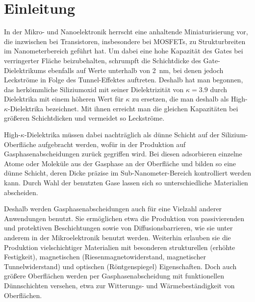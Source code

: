 \cleardoublepage
\chapter{Einleitung}
\label{intro}


In der Mikro- und Nanoelektronik herrscht eine anhaltende Miniaturisierung vor, die inzwischen bei Transistoren, insbesondere bei MOSFETs, zu Strukturbreiten im Nanometerbereich geführt hat.
Um dabei eine hohe Kapazität des Gates bei verringerter Fläche beizubehalten, schrumpft die Schichtdicke des Gate-Dielektrikums ebenfalls auf Werte unterhalb von \SI{2}{\nano\meter}, bei denen jedoch Leckströme in Folge des Tunnel-Effektes auftreten.
Deshalb hat man begonnen, das herkömmliche Siliziumoxid mit seiner Dielektrizität von $\kappa=\num{3.9}$ durch Dielektrika mit einem höheren Wert für $\kappa$ zu ersetzen, die man deshalb als High-$\kappa$-Dielektrika bezeichnet.
Mit ihnen erreicht man die gleichen Kapazitäten bei größeren Schichtdicken und vermeidet so Leckströme.%


High-$\kappa$-Dielektrika müssen dabei nachträglich als dünne Schicht auf der Silizium-Oberfläche aufgebracht werden, wofür in der Produktion auf Gasphasenabscheidungen zurück gegriffen wird.
Bei diesen adsorbieren einzelne Atome oder Moleküle aus der Gasphase an der Oberfläche und bilden so eine dünne Schicht, deren Dicke präzise im Sub-Nanometer-Bereich kontrolliert werden kann.
Durch Wahl der benutzten Gase lassen sich so unterschiedliche Materialien abscheiden.

Deshalb werden Gasphasenabscheidungen auch für eine Vielzahl anderer Anwendungen benutzt.
Sie ermöglichen etwa die Produktion von passivierenden und protektiven Beschichtungen sowie von Diffusionsbarrieren, wie sie unter anderem in der Mikroelektronik benutzt werden.
Weiterhin erlauben sie die Produktion vielschichtiger Materialien mit besonderen strukturellen (erhöhte Festigkeit), magnetischen (Riesenmagnetowiderstand, magnetischer Tunnelwiderstand) und optischen (Röntgenspiegel) Eigenschaften.
Doch auch größere Oberflächen werden per Gasphasenabscheidung mit funktionellen Dünnschichten versehen, etwa zur Witterungs- und Wärmebeständigkeit von Oberflächen.

